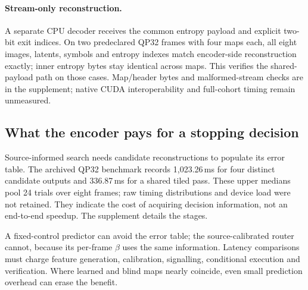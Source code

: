 \paragraph{Stream-only reconstruction.}
A separate CPU decoder receives the common entropy payload and explicit
two-bit exit indices. On two predeclared QP32 frames with four maps each,
all eight images, latents, symbols and entropy indexes match encoder-side
reconstruction exactly; inner entropy bytes stay identical across maps.
This verifies the shared-payload path on those cases. Map/header bytes and
malformed-stream checks are in the supplement; native CUDA interoperability
and full-cohort timing remain unmeasured.

\subsection{What the encoder pays for a stopping decision}

Source-informed search needs candidate reconstructions to populate its error
table. The archived QP32 benchmark records 1,023.26\,ms for four distinct
candidate outputs and 336.87\,ms for a shared tiled pass. These upper
medians pool 24 trials over eight frames; raw timing distributions and
device load were not retained. They indicate the cost of acquiring decision
information, not an end-to-end speedup. The supplement details the stages.

A fixed-control predictor can avoid the error table; the source-calibrated
router cannot, because its per-frame $\beta$ uses the same information.
Latency comparisons must charge feature generation, calibration, signalling,
conditional execution and verification. Where learned and blind maps nearly
coincide, even small prediction overhead can erase the benefit.
